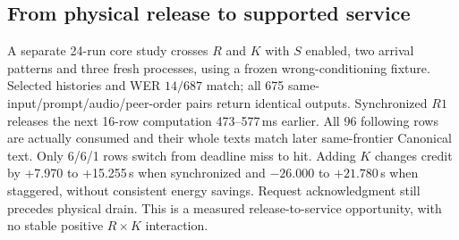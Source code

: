 \subsection{From physical release to supported service}
\label{subsec:release_evidence}
A separate 24-run core study crosses $R$ and $K$ with $S$ enabled,
two arrival patterns and three fresh processes, using a frozen
wrong-conditioning fixture. Selected histories and WER $14/687$ match;
all 675 same-input/prompt/audio/peer-order pairs return identical outputs.
Synchronized $R1$ releases the next 16-row computation 473--577\,ms
earlier. All 96 following rows are actually consumed and their whole
texts match later same-frontier Canonical text. Only 6/6/1 rows switch
from deadline miss to hit. Adding $K$ changes credit by +7.970 to
+15.255\,s when synchronized and $-26.000$ to $+21.780$\,s when
staggered, without consistent energy savings. Request acknowledgment
still precedes physical drain. This is a measured release-to-service
opportunity, with no stable positive $R\times K$ interaction.

